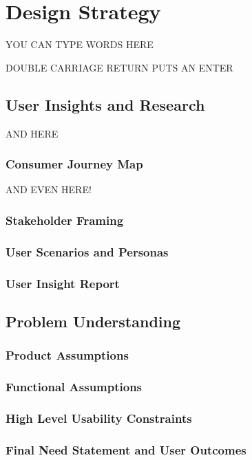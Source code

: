 \documentclass[a4paper, 10pt]{article}
\begin{document}
\begin{titlepage}
\end{titlepage}

\pagebreak{}

\tableofcontents

\pagebreak{}

\section{Design Strategy}
	YOU CAN TYPE WORDS HERE
	
	DOUBLE CARRIAGE RETURN PUTS AN ENTER
	\subsection{User Insights and Research}
		AND HERE
		\subsubsection{Consumer Journey Map}
			AND EVEN HERE!
		\subsubsection{Stakeholder Framing}
		\subsubsection{User Scenarios and Personas}
		\subsubsection{User Insight Report}
	\subsection{Problem Understanding}
		\subsubsection{Product Assumptions}
		\subsubsection{Functional Assumptions}
		\subsubsection{High Level Usability Constraints}
		\subsubsection{Final Need Statement and User Outcomes}
\end{document}
